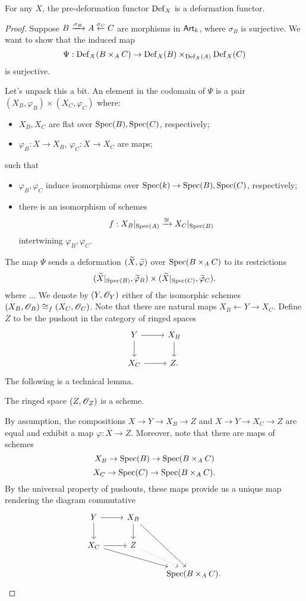 \documentclass[11pt]{amsart}
\def\Spec{{\rm Spec}}
\begin{document}
\begin{prop}
For any $X$, the pre-deformation functor ${\rm Def}_X$ is a deformation functor. 
\end{prop}
\begin{proof}
Suppose $B \xto{\sigma_B} A \overset{\sigma_C}{\leftarrow} C$ are morphisms in $\Art_k$, where $\sigma_B$ is surjective. 
We want to show that the induced map
\[
\Psi : \Def_X (B \times_A C) \to \Def_X(B) \times_{\Def_X(A)} \Def_X(C)
\]
is surjective. 

Let's unpack this a bit. 
An element in the codomain of $\Psi$ is a pair $(X_B, \varphi_B) \times (X_C,\varphi_C)$ where:
\begin{itemize}
\item $X_B,X_C$ are flat over $\Spec(B), \Spec(C)$, respectively;
\item $\varphi_B : X \to X_B$, $\varphi_C : X \to X_C$ are maps;
\end{itemize}
such that 
\begin{itemize}
\item $\varphi_B,\varphi_C$ induce isomorphisms over $\Spec(k) \to \Spec(B), \Spec(C)$, respectively; 
\item there is an isomorphism of schemes
\[
f : X_B |_{\Spec(A)} \xto{\cong} X_C |_{\Spec(B)}
\] 
intertwining $\varphi_B,\varphi_C$. 
\end{itemize} 

The map $\Psi$ sends a deformation $(\Tilde{X}, \Tilde{\varphi})$ over $\Spec(B \times_A C)$ to its restrictions
\[
(\Tilde{X} |_{\Spec(B)}, \Tilde{\varphi}_B) \times (\Tilde{X} |_{\Spec(C)}, \Tilde{\varphi}_C) .
\]
where ...
We denote by $(Y, \sO_Y)$ either of the isomorphic schemes $(X_B, \sO_B) \cong_f (X_C, \sO_C)$. 
Note that there are natural maps $X_B \leftarrow Y \to X_C$. 
Define $Z$ to be the pushout in the category of ringed spaces
\[
\begin{tikzcd}
Y \ar[r] \ar[d] & X_B \ar[d] \\ X_C \ar[r] & Z .
\end{tikzcd}
\] 
The following is a technical lemma.
\begin{lem} The ringed space $(Z,\sO_Z)$ is a scheme.
\end{lem}

By assumption, the compositions $X \to Y \to X_B \to Z$ and $X \to Y \to X_C \to Z$ are equal and exhibit a map $\varphi : X \to Z$. 
Moreover, note that there are maps of schemes
\[
X_B \to \Spec(B) \to \Spec(B \times_A C)
\]
\[
X_C \to \Spec(C) \to \Spec(B \times_A C) .
\] 
By the universal property of pushouts, these maps provide us a unique map rendering the diagram commutative
\[
\begin{tikzcd}
Y \ar[r] \ar[d] & X_B \ar[d] \ar[ddr] & \\ 
X_C \ar[r] \ar[drr] & Z \ar[dr, dotted] & \\ 
& & \Spec(B \times_A C) .
\end{tikzcd}
\] 


\end{proof}
\end{document}
